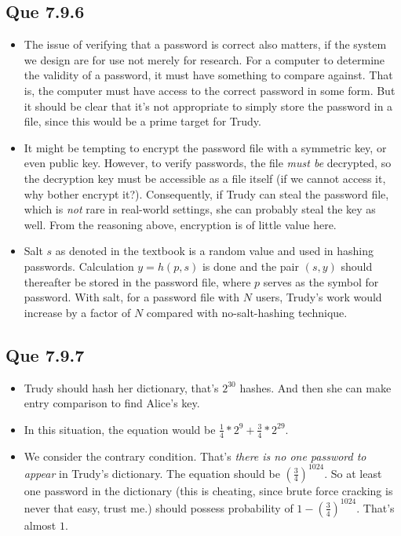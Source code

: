 \documentclass{article}
\begin{document}
\subsection{Que 7.9.6}
\label{sec:que-7.9.6}
\begin{itemize}
\item The issue of verifying that a password is correct also matters,
  if the system we design are for use not merely for research. For a
  computer to determine the validity of a password, it must have
  something to compare against. That is, the computer must have access
  to the correct password in some form. But it should be clear that
  it's not appropriate to simply store the password in a file, since
  this would be a prime target for Trudy.
\item It might be tempting to encrypt the password file with a
  symmetric key, or even public key. However, to verify passwords, the
  file \emph{must be} decrypted, so the decryption key must be
  accessible as a file itself (if we cannot access it, why bother
  encrypt it?). Consequently, if Trudy can steal the password file,
  which is \emph{not} rare in real-world settings, she can probably
  steal the key as well. From the reasoning above, encryption is of
  little value here.
\item Salt $s$ as denoted in the textbook is a random value and used
  in hashing passwords. Calculation $y=h(p,s)$ is done and the pair
  $(s,y)$ should thereafter be stored in the password file, where $p$
  serves as the symbol for password. With salt, for a password file
  with $N$ users, Trudy's work would increase by a factor of $N$
  compared with no-salt-hashing technique. 
\end{itemize}

\subsection{Que 7.9.7}
\label{sec:que-7.9.7}

\begin{itemize}
\item Trudy should hash her dictionary, that's $2^{30}$ hashes. And
  then she can make entry comparison to find Alice's key.
\item In this situation, the equation would be $\frac{1}{4}\ast
  2^{9}+\frac{3}{4}\ast 2^{29}$.
\item We consider the contrary condition. That's \emph{there is no one
  password to appear} in Trudy's dictionary. The equation should be
${(\frac{3}{4})}^{1024}$. So at least one password in the dictionary
(this is cheating, since brute force cracking is never that easy,
trust me.) should possess probability of
$1-{(\frac{3}{4})}^{1024}$. That's almost $1$.
\end{itemize}
\end{document}
